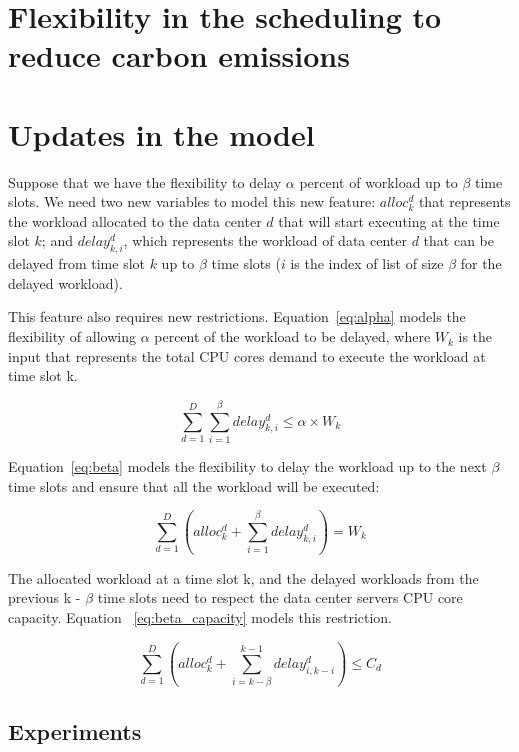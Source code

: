 \section{Flexibility in the scheduling to reduce carbon emissions}

\section{Updates in the model}

Suppose that we have the flexibility to delay $\alpha$ percent of workload up to $\beta$ time slots. We need two new variables to model this new feature: $alloc^d_k$ that represents the workload allocated to the data center $d$ that will start executing at the time slot $k$; and $delay_{k,i}^d$, which represents the workload of data center $d$ that can be delayed from time slot $k$ up to $\beta$ time slots ($i$ is the index of list of size $\beta$ for the delayed workload).

This feature also requires new restrictions. Equation~\eqref{eq:alpha} models the flexibility of allowing $\alpha$ percent of the workload to be delayed, where $W_k$ is the input that represents the total CPU cores demand to execute the workload at time slot k.


\begin{equation} \label{eq:alpha}
   \sum_{d=1}^D  \sum_{i=1}^{\beta} delay_{k,i}^d \leq  \alpha   \times W_k
\end{equation}


Equation~\eqref{eq:beta} models the flexibility to delay the workload up to the next $\beta$ time slots and ensure that all the workload will be executed:


\begin{equation} \label{eq:beta}
       \sum_{d=1}^D    (  alloc_k^d +    \sum_{i=1}^{\beta} delay_{k,i}^d  ) = W_k  
     \end{equation}

The allocated workload at a time slot k, and the delayed workloads from the previous k - $\beta$ time slots need to respect the data center servers CPU core capacity. Equation ~\eqref{eq:beta_capacity} models this restriction. 

\begin{equation} \label{eq:beta_capacity}
\sum_{d=1}^D    (  alloc_k^d  +    \sum_{i=k-\beta}^{k-1} delay_{  i ,  k-i  }^d  )  \leq C_d 
\end{equation}

\subsection{Experiments}

